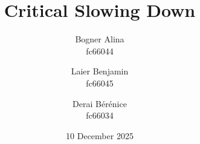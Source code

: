 \documentclass{article}
\title{Critical Slowing Down}
\author{
  Bogner Alina \\
  fc66044
  \and
  Laier Benjamin \\
  fc66045
  \and 
  Derai Bérénice \\
  fc66034
  }
\date{10 December 2025}
\begin{document}
\maketitle

\newpage

	\vfill
	
	\vfill

\newpage

	\vfill
	\tableofcontents
	\vfill
	\newpage
	\vfill
	\listoffigures
	\vfill

\newpage

	
	
	
	
	

	
	

\newpage
\end{document}
